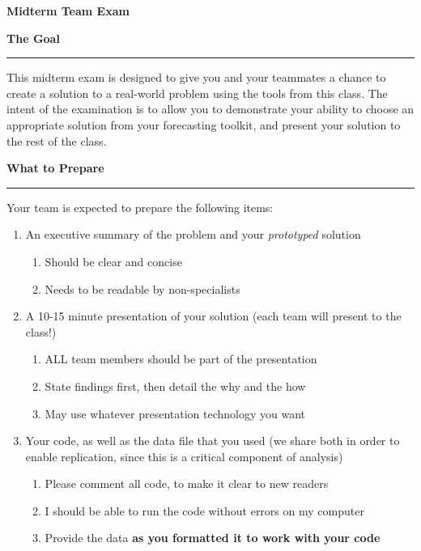 \documentclass{article}
\begin{document}
\pagestyle{empty}

\begin{center} \Huge \textbf{Midterm Team Exam} \end{center}
\vspace*{1em}

\noindent \Large \textbf{The Goal}\\[-.8em]\hrule \vspace*{.5em}

\large \noindent This midterm exam is designed to give you and your teammates a chance to create a solution to a real-world problem using the tools from this class. The intent of the examination is to allow you to demonstrate your ability to choose an appropriate solution from your forecasting toolkit, and present your solution to the rest of the class.

\vspace*{2em}
\noindent \Large \textbf{What to Prepare}\\[-.8em]\hrule \vspace*{.5em}
\large \noindent Your team is expected to prepare the following items:
\begin{enumerate}
\item An executive summary of the problem and your \emph{prototyped} solution
\begin{enumerate}
\item Should be clear and concise
\item Needs to be readable by non-specialists
\end{enumerate}
\item A 10-15 minute presentation of your solution (each team will present to the class!)
\begin{enumerate}
\item ALL team members should be part of the presentation
\item State findings first, then detail the why and the how
\item May use whatever presentation technology you want
\end{enumerate}
\item Your code, as well as the data file that you used (we share both in order to enable replication, since this is a critical component of analysis)
\begin{enumerate}
\item Please comment all code, to make it clear to new readers
\item I should be able to run the code without errors on my computer
\item Provide the data \textbf{as you formatted it to work with your code}
\end{enumerate}
\end{enumerate}
\end{document}
